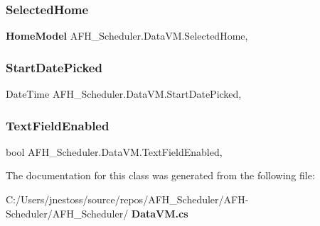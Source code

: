 \mbox{\label{class_a_f_h___scheduler_1_1_data_v_m_a0d820632d3566a3e733c677de0c7bd29}} 
\subsubsection{SelectedHome}
{\footnotesize\ttfamily \textbf{ Home\+Model} A\+F\+H\+\_\+\+Scheduler.\+Data\+V\+M.\+Selected\+Home\hspace{0.3cm}{\ttfamily [get]}, {\ttfamily [set]}}

\mbox{\label{class_a_f_h___scheduler_1_1_data_v_m_a12e84d60a08a2e5265e0edeaff493b61}} 
\subsubsection{StartDatePicked}
{\footnotesize\ttfamily Date\+Time A\+F\+H\+\_\+\+Scheduler.\+Data\+V\+M.\+Start\+Date\+Picked\hspace{0.3cm}{\ttfamily [get]}, {\ttfamily [set]}}

\mbox{\label{class_a_f_h___scheduler_1_1_data_v_m_a2e6eb006502aeaff72ad2cb226d83679}} 
\subsubsection{TextFieldEnabled}
{\footnotesize\ttfamily bool A\+F\+H\+\_\+\+Scheduler.\+Data\+V\+M.\+Text\+Field\+Enabled\hspace{0.3cm}{\ttfamily [get]}, {\ttfamily [set]}}



The documentation for this class was generated from the following file\+:\begin{DoxyCompactItemize}
\item 
C\+:/\+Users/jnestoss/source/repos/\+A\+F\+H\+\_\+\+Scheduler/\+A\+F\+H-\/\+Scheduler/\+A\+F\+H\+\_\+\+Scheduler/\textbf{ Data\+V\+M.\+cs}\end{DoxyCompactItemize}
